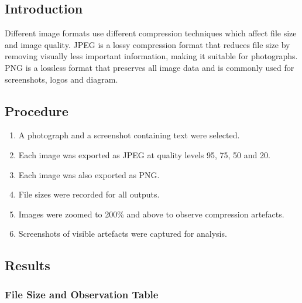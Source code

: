 \documentclass[12pt,a4paper]{article}
\begin{document}
\subsection{Introduction}

Different image formats use different compression techniques which affect file size and image quality. JPEG is a lossy compression format that reduces file size by removing visually less important information, making it suitable for photographs. PNG is a lossless format that preserves all image data and is commonly used for screenshots, logos and diagram.

\subsection{Procedure}

\begin{enumerate}
    \item A photograph and a screenshot containing text were selected.
    \item Each image was exported as JPEG at quality levels 95, 75, 50 and 20.
    \item Each image was also exported as PNG.
    \item File sizes were recorded for all outputs.
    \item Images were zoomed to 200\% and above to observe compression artefacts.
    \item Screenshots of visible artefacts were captured for analysis.
\end{enumerate}

\subsection{Results}

\subsubsection{File Size and Observation Table}
\end{document}
